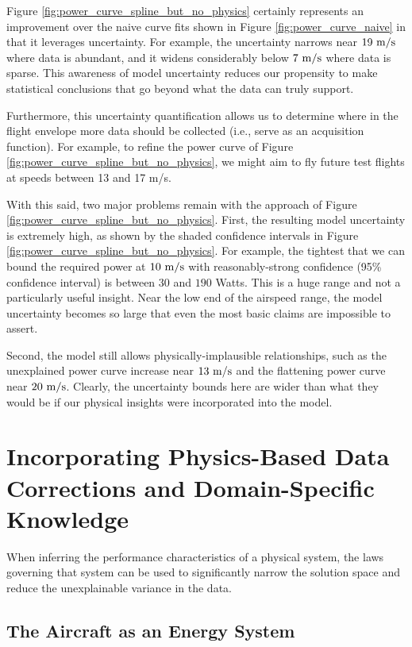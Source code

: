 \documentclass[conf]{new-aiaa}
\begin{document}
    Figure \ref{fig:power_curve_spline_but_no_physics} certainly represents an improvement over the naive curve fits shown in Figure \ref{fig:power_curve_naive} in that it leverages uncertainty. For example, the uncertainty narrows near $19\ \rm m/s$ where data is abundant, and it widens considerably below $7\ \rm m/s$ where data is sparse. This awareness of model uncertainty reduces our propensity to make statistical conclusions that go beyond what the data can truly support.

    Furthermore, this uncertainty quantification allows us to determine where in the flight envelope more data should be collected (i.e., serve as an acquisition function). For example, to refine the power curve of Figure \ref{fig:power_curve_spline_but_no_physics}, we might aim to fly future test flights at speeds between 13 and 17 m/s.

    With this said, two major problems remain with the approach of Figure \ref{fig:power_curve_spline_but_no_physics}. First, the resulting model uncertainty is extremely high, as shown by the shaded confidence intervals in Figure \ref{fig:power_curve_spline_but_no_physics}. For example, the tightest that we can bound the required power at $10\ \rm m/s$ with reasonably-strong confidence (95\% confidence interval) is between $30$ and $190$ Watts. This is a huge range and not a particularly useful insight. Near the low end of the airspeed range, the model uncertainty becomes so large that even the most basic claims are impossible to assert.

    Second, the model still allows physically-implausible relationships, such as the unexplained power curve increase near $13\ \rm m/s$ and the flattening power curve near $20\ \rm m/s$. Clearly, the uncertainty bounds here are wider than what they would be if our physical insights were incorporated into the model.


    \section{Incorporating Physics-Based Data Corrections and Domain-Specific Knowledge}
    \label{sec:physics_based_corrections}

    When inferring the performance characteristics of a physical system, the laws governing that system can be used to significantly narrow the solution space and reduce the unexplainable variance in the data.

    \subsection{The Aircraft as an Energy System}
\end{document}
